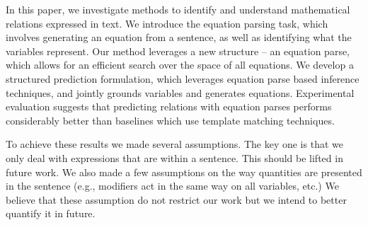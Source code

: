   In this paper, we investigate methods to identify and understand
  mathematical relations expressed in text. We introduce the equation
  parsing task, which involves generating an equation from a sentence,
  as well as identifying what the variables represent. Our method
  leverages a new structure -- an equation parse, which allows for an
  efficient search over the space of all equations. We develop a
  structured prediction formulation, which leverages equation parse
  based inference techniques, and jointly grounds variables and
  generates equations. Experimental evaluation suggests that
  predicting relations with equation parses performs considerably
  better than baselines which use template matching techniques.

  To achieve these results we made several assumptions. The key one is
  that we only deal with expressions that are within a sentence. This
  should be lifted in future work. We also made a few assumptions on
  the way quantities are presented in the sentence (e.g., modifiers
  act in the same way on all variables, etc.) We believe that these
  assumption do not restrict our work but we intend to better quantify
  it in future.
